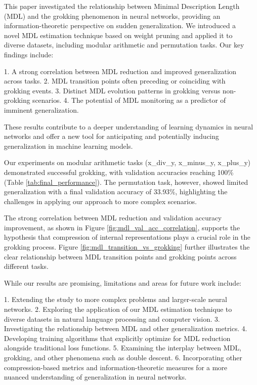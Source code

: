 \documentclass{article} %
\begin{document}
This paper investigated the relationship between Minimal Description Length (MDL) and the grokking phenomenon in neural networks, providing an information-theoretic perspective on sudden generalization. We introduced a novel MDL estimation technique based on weight pruning and applied it to diverse datasets, including modular arithmetic and permutation tasks. Our key findings include:

1. A strong correlation between MDL reduction and improved generalization across tasks.
2. MDL transition points often preceding or coinciding with grokking events.
3. Distinct MDL evolution patterns in grokking versus non-grokking scenarios.
4. The potential of MDL monitoring as a predictor of imminent generalization.

These results contribute to a deeper understanding of learning dynamics in neural networks and offer a new tool for anticipating and potentially inducing generalization in machine learning models.

Our experiments on modular arithmetic tasks (x\_div\_y, x\_minus\_y, x\_plus\_y) demonstrated successful grokking, with validation accuracies reaching 100\% (Table \ref{tab:final_performance}). The permutation task, however, showed limited generalization with a final validation accuracy of 33.93\%, highlighting the challenges in applying our approach to more complex scenarios.

The strong correlation between MDL reduction and validation accuracy improvement, as shown in Figure \ref{fig:mdl_val_acc_correlation}, supports the hypothesis that compression of internal representations plays a crucial role in the grokking process. Figure \ref{fig:mdl_transition_vs_grokking} further illustrates the clear relationship between MDL transition points and grokking points across different tasks.

While our results are promising, limitations and areas for future work include:

1. Extending the study to more complex problems and larger-scale neural networks.
2. Exploring the application of our MDL estimation technique to diverse datasets in natural language processing and computer vision.
3. Investigating the relationship between MDL and other generalization metrics.
4. Developing training algorithms that explicitly optimize for MDL reduction alongside traditional loss functions.
5. Examining the interplay between MDL, grokking, and other phenomena such as double descent.
6. Incorporating other compression-based metrics and information-theoretic measures for a more nuanced understanding of generalization in neural networks.
\end{document}
